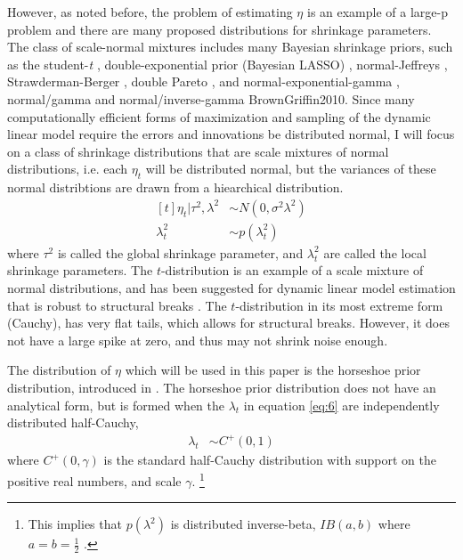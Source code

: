 \documentclass{article}
\begin{document}
However, as noted before, the problem of estimating $\eta$ is an example of a large-p problem and there are many proposed distributions for shrinkage parameters.
The class of scale-normal mixtures includes many Bayesian shrinkage priors, such as the student-\textit{t} \parencite{Tipping2001}, double-exponential prior (Bayesian LASSO) \parencites{LiGoel2006}{ParkCasella2008}{Hans2009}, normal-Jeffreys \parencites{FigueiredoMember2003}{BaeMallick2004}, Strawderman-Berger \parencites{Strawderman1971}{Berger1980}, double Pareto \parencite{ArmaganDunsonLee2011},  and normal-exponential-gamma \parencite{BrownGriffin2005}, normal/gamma and normal/inverse-gamma \parencite{CaronDoucet2008}{BrownGriffin2010}.
Since many computationally efficient forms of maximization and sampling of the dynamic linear model require the errors and innovations be distributed normal, I will focus on a class of shrinkage distributions that are scale mixtures of normal distributions, i.e. each $\eta_{t}$ will be distributed normal, but the variances of these normal distribtions are drawn from a hiearchical distribution.
\begin{equation}
  \label{eq:6}
  \begin{aligned}[t]
    \eta_{t} | \tau^{2}, \lambda^{2} & \sim N(0, \sigma^{2} \lambda^{2}) \\
    \lambda_{t}^{2} & \sim p(\lambda^{2}_{t})
  \end{aligned}
\end{equation}
where $\tau^{2}$ is called the global shrinkage parameter, and $\lambda_{t}^{2}$ are called the local shrinkage parameters.
The $t$-distribution is an example of a scale mixture of normal distributions, and has been suggested for dynamic linear model estimation that is robust to structural breaks \parencites{HarveyKoopman2000}{PetrisPetroneEtAl2009}.
The $t$-distribution in its most extreme form (Cauchy), has very flat tails, which allows for structural breaks.
However, it does not have a large spike at zero, and thus may not shrink noise enough.

The distribution of $\eta$ which will be used in this paper is the horseshoe prior distribution, introduced in \textcites{CarvalhoPolsonScott2009}{CarvalhoPolsonScott2010}.
The horseshoe prior distribution does not have an analytical form, but is formed when the $\lambda_{t}$ in equation \eqref{eq:6} are independently distributed half-Cauchy,
\begin{align}
  \label{eq:13}
  \lambda_{t} &\sim C^{+}(0, 1)
\end{align}
where $C^{+}(0, \gamma)$ is the standard half-Cauchy distribution with support on the positive real numbers, and scale $\gamma$.%
\footnote{
  This implies that $p(\lambda^{2})$ is distributed inverse-beta, $IB(a, b)$ where $a = b = \frac{1}{2}$ \parencite[4]{PolsonScott2010}. 
}
\end{document}

